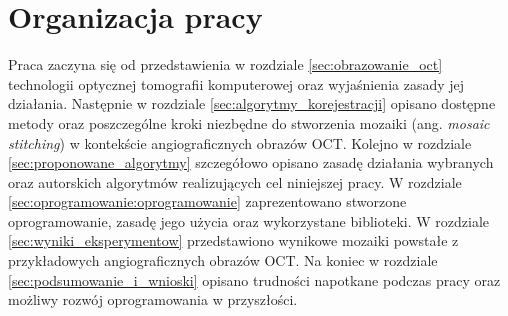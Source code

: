 \section{Organizacja pracy}
\label{sec:wstep:organizacja_pracy}

Praca zaczyna się od przedstawienia w rozdziale \ref{sec:obrazowanie_oct} technologii optycznej tomografii komputerowej oraz wyjaśnienia zasady jej działania. Następnie w rozdziale \ref{sec:algorytmy_korejestracji} opisano dostępne metody oraz poszczególne kroki niezbędne do stworzenia mozaiki (ang. \textit{mosaic stitching}) w kontekście angiograficznych obrazów OCT. Kolejno w rozdziale \ref{sec:proponowane_algorytmy} szczegółowo opisano zasadę działania wybranych oraz autorskich algorytmów realizujących cel niniejszej pracy. W rozdziale \ref{sec:oprogramowanie:oprogramowanie} zaprezentowano stworzone oprogramowanie, zasadę jego użycia oraz wykorzystane biblioteki. W rozdziale \ref{sec:wyniki_eksperymentow} przedstawiono wynikowe mozaiki powstałe z przykładowych angiograficznych obrazów OCT. Na koniec w rozdziale \ref{sec:podsumowanie_i_wnioski} opisano trudności napotkane podczas pracy oraz możliwy rozwój oprogramowania w przyszłości.


